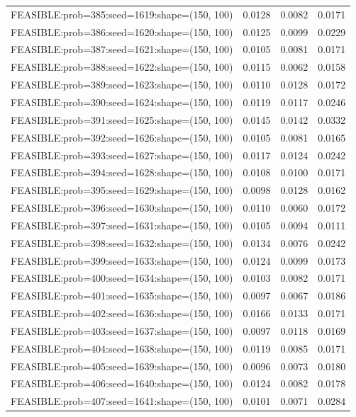\begin{longtable}{lccc}
FEASIBLE:prob=385:seed=1619:shape=(150, 100) &   0.0128 & 0.0082 & 0.0171 \\
FEASIBLE:prob=386:seed=1620:shape=(150, 100) &   0.0125 & 0.0099 & 0.0229 \\
FEASIBLE:prob=387:seed=1621:shape=(150, 100) &   0.0105 & 0.0081 & 0.0171 \\
FEASIBLE:prob=388:seed=1622:shape=(150, 100) &   0.0115 & 0.0062 & 0.0158 \\
FEASIBLE:prob=389:seed=1623:shape=(150, 100) &   0.0110 & 0.0128 & 0.0172 \\
FEASIBLE:prob=390:seed=1624:shape=(150, 100) &   0.0119 & 0.0117 & 0.0246 \\
FEASIBLE:prob=391:seed=1625:shape=(150, 100) &   0.0145 & 0.0142 & 0.0332 \\
FEASIBLE:prob=392:seed=1626:shape=(150, 100) &   0.0105 & 0.0081 & 0.0165 \\
FEASIBLE:prob=393:seed=1627:shape=(150, 100) &   0.0117 & 0.0124 & 0.0242 \\
FEASIBLE:prob=394:seed=1628:shape=(150, 100) &   0.0108 & 0.0100 & 0.0171 \\
FEASIBLE:prob=395:seed=1629:shape=(150, 100) &   0.0098 & 0.0128 & 0.0162 \\
FEASIBLE:prob=396:seed=1630:shape=(150, 100) &   0.0110 & 0.0060 & 0.0172 \\
FEASIBLE:prob=397:seed=1631:shape=(150, 100) &   0.0105 & 0.0094 & 0.0111 \\
FEASIBLE:prob=398:seed=1632:shape=(150, 100) &   0.0134 & 0.0076 & 0.0242 \\
FEASIBLE:prob=399:seed=1633:shape=(150, 100) &   0.0124 & 0.0099 & 0.0173 \\
FEASIBLE:prob=400:seed=1634:shape=(150, 100) &   0.0103 & 0.0082 & 0.0171 \\
FEASIBLE:prob=401:seed=1635:shape=(150, 100) &   0.0097 & 0.0067 & 0.0186 \\
FEASIBLE:prob=402:seed=1636:shape=(150, 100) &   0.0166 & 0.0133 & 0.0171 \\
FEASIBLE:prob=403:seed=1637:shape=(150, 100) &   0.0097 & 0.0118 & 0.0169 \\
FEASIBLE:prob=404:seed=1638:shape=(150, 100) &   0.0119 & 0.0085 & 0.0171 \\
FEASIBLE:prob=405:seed=1639:shape=(150, 100) &   0.0096 & 0.0073 & 0.0180 \\
FEASIBLE:prob=406:seed=1640:shape=(150, 100) &   0.0124 & 0.0082 & 0.0178 \\
FEASIBLE:prob=407:seed=1641:shape=(150, 100) &   0.0101 & 0.0071 & 0.0284 \\

\end{longtable}
